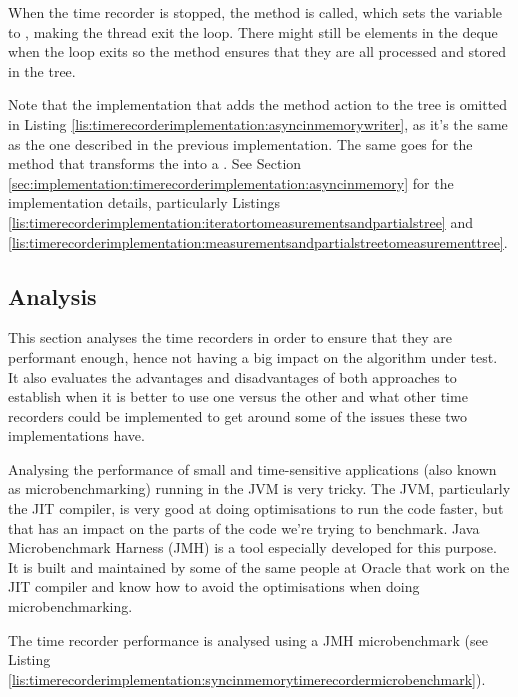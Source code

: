 \noindent When the time recorder is stopped, the  method is called, which sets the  variable to , making the thread exit the loop. There might still be elements in the deque when the loop exits so the  method ensures that they are all processed and stored in the tree.

\noindent Note that the implementation that adds the method action to the tree is omitted in Listing \ref{lis:timerecorderimplementation:asyncinmemorywriter}, as it's the same as the one described in the previous implementation. The same goes for the method that transforms the  into a . See Section \ref{sec:implementation:timerecorderimplementation:asyncinmemory} for the implementation details, particularly Listings \ref{lis:timerecorderimplementation:iteratortomeasurementsandpartialstree} and \ref{lis:timerecorderimplementation:measurementsandpartialstreetomeasurementtree}.

\subsection{Analysis}
\label{sec:implementation:timerecorderimplementation:analysis}
This section analyses the time recorders in order to ensure that they are performant enough, hence not having a big impact on the algorithm under test. It also evaluates the advantages and disadvantages of both approaches to establish when it is better to use one versus the other and what other time recorders could be implemented to get around some of the issues these two implementations have.

\noindent Analysing the performance of small and time-sensitive applications (also known as microbenchmarking) running in the JVM is very tricky. The JVM, particularly the JIT compiler, is very good at doing optimisations to run the code faster, but that has an impact on the parts of the code we're trying to benchmark. Java Microbenchmark Harness (JMH) is a tool especially developed for this purpose. It is built and maintained by some of the same people at Oracle that work on the JIT compiler and know how to avoid the optimisations when doing microbenchmarking.

\noindent The time recorder performance is analysed using a JMH microbenchmark (see Listing \ref{lis:timerecorderimplementation:syncinmemorytimerecordermicrobenchmark}).

